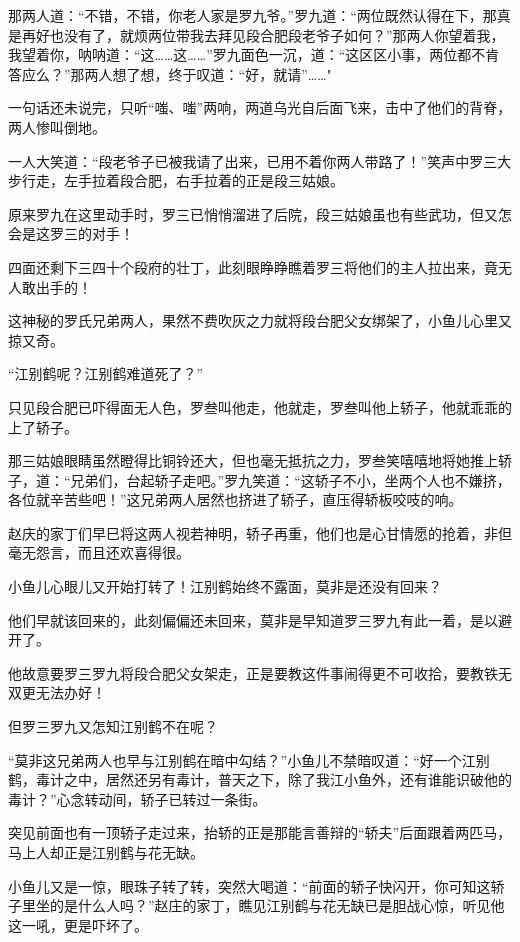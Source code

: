 \documentclass[12pt,oneside]{book}
\begin{document}
那两人道：``不错，不错，你老人家是罗九爷。''罗九道：``两位既然认得在下，那真是再好也没有了，就烦两位带我去拜见段合肥段老爷子如何？''那两人你望着我，我望着你，呐呐道：``这\ldots\ldots 这\ldots\ldots{}''罗九面色一沉，道：``这区区小事，两位都不肯答应么？''那两人想了想，终于叹道：``好，就请''\ldots\ldots"

一句话还未说完，只听``嗤、嗤''两响，两道乌光自后面飞来，击中了他们的背脊，两人惨叫倒地。

一人大笑道：``段老爷子已被我请了出来，已用不着你两人带路了！''笑声中罗三大步行走，左手拉着段合肥，右手拉着的正是段三姑娘。

原来罗九在这里动手时，罗三已悄悄溜进了后院，段三姑娘虽也有些武功，但又怎会是这罗三的对手！

四面还剩下三四十个段府的壮丁，此刻眼睁睁瞧着罗三将他们的主人拉出来，竟无人敢出手的！

这神秘的罗氏兄弟两人，果然不费吹灰之力就将段台肥父女绑架了，小鱼儿心里又掠又奇。

``江别鹤呢？江别鹤难道死了？''

只见段合肥已吓得面无人色，罗叁叫他走，他就走，罗叁叫他上轿子，他就乖乖的上了轿子。

那三姑娘眼睛虽然瞪得比铜铃还大，但也毫无抵抗之力，罗叁笑嘻嘻地将她推上轿子，道：``兄弟们，台起轿子走吧。''罗九笑道：``这轿子不小，坐两个人也不嫌挤，各位就辛苦些吧！''这兄弟两人居然也挤进了轿子，直压得轿板咬吱的响。

赵庆的家丁们早巳将这两人视若神明，轿子再重，他们也是心甘情愿的抢着，非但毫无怨言，而且还欢喜得很。

小鱼儿心眼儿又开始打转了！江别鹤始终不露面，莫非是还没有回来？

他们早就该回来的，此刻偏偏还未回来，莫非是早知道罗三罗九有此一着，是以避开了。

他故意要罗三罗九将段合肥父女架走，正是要教这件事闹得更不可收拾，要教铁无双更无法办好！

但罗三罗九又怎知江别鹤不在呢？

``莫非这兄弟两人也早与江别鹤在暗中勾结？''小鱼儿不禁暗叹道：``好一个江别鹤，毒计之中，居然还另有毒计，普天之下，除了我江小鱼外，还有谁能识破他的毒计？''心念转动间，轿子已转过一条街。

突见前面也有一顶轿子走过来，抬轿的正是那能言善辩的``轿夫''后面跟着两匹马，马上人却正是江别鹤与花无缺。

小鱼儿又是一惊，眼珠子转了转，突然大喝道：``前面的轿子快闪开，你可知这轿子里坐的是什么人吗？''赵庄的家丁，瞧见江别鹤与花无缺已是胆战心惊，听见他这一吼，更是吓坏了。
\end{document}
